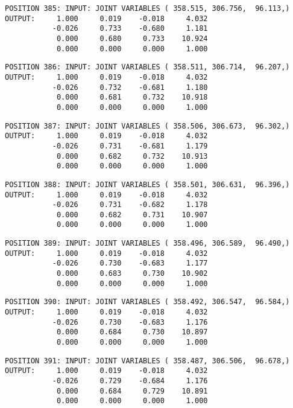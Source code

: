 \begin{verbatim}
POSITION 385: INPUT: JOINT VARIABLES ( 358.515, 306.756,  96.113,)
OUTPUT:     1.000     0.019    -0.018     4.032
           -0.026     0.733    -0.680     1.181
            0.000     0.680     0.733    10.924
            0.000     0.000     0.000     1.000
\end{verbatim} \pagebreak[1]\begin{verbatim}
POSITION 386: INPUT: JOINT VARIABLES ( 358.511, 306.714,  96.207,)
OUTPUT:     1.000     0.019    -0.018     4.032
           -0.026     0.732    -0.681     1.180
            0.000     0.681     0.732    10.918
            0.000     0.000     0.000     1.000
\end{verbatim} \pagebreak[1]\begin{verbatim}
POSITION 387: INPUT: JOINT VARIABLES ( 358.506, 306.673,  96.302,)
OUTPUT:     1.000     0.019    -0.018     4.032
           -0.026     0.731    -0.681     1.179
            0.000     0.682     0.732    10.913
            0.000     0.000     0.000     1.000
\end{verbatim} \pagebreak[1]\begin{verbatim}
POSITION 388: INPUT: JOINT VARIABLES ( 358.501, 306.631,  96.396,)
OUTPUT:     1.000     0.019    -0.018     4.032
           -0.026     0.731    -0.682     1.178
            0.000     0.682     0.731    10.907
            0.000     0.000     0.000     1.000
\end{verbatim} \pagebreak[1]\begin{verbatim}
POSITION 389: INPUT: JOINT VARIABLES ( 358.496, 306.589,  96.490,)
OUTPUT:     1.000     0.019    -0.018     4.032
           -0.026     0.730    -0.683     1.177
            0.000     0.683     0.730    10.902
            0.000     0.000     0.000     1.000
\end{verbatim} \pagebreak[1]\begin{verbatim}
POSITION 390: INPUT: JOINT VARIABLES ( 358.492, 306.547,  96.584,)
OUTPUT:     1.000     0.019    -0.018     4.032
           -0.026     0.730    -0.683     1.176
            0.000     0.684     0.730    10.897
            0.000     0.000     0.000     1.000
\end{verbatim} \pagebreak[1]\begin{verbatim}
POSITION 391: INPUT: JOINT VARIABLES ( 358.487, 306.506,  96.678,)
OUTPUT:     1.000     0.019    -0.018     4.032
           -0.026     0.729    -0.684     1.176
            0.000     0.684     0.729    10.891
            0.000     0.000     0.000     1.000
\end{verbatim} \pagebreak[1]\begin{verbatim}

\end{verbatim}
